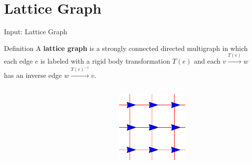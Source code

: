 \documentclass[10pt]{beamer}
\newcommand{\edge}[3]{{#1}\overset{#2}{\longrightarrow}{#3}}
\begin{document}
\section{Lattice Graph}
\begin{frame}{Input: Lattice Graph}
    \begin{bclogo}[logo=\bccrayon, couleur=orange!10, arrondi=0.2, ombre=true]{Definition}
      A \textbf{lattice graph} is a strongly connected directed
      multigraph in which each edge $e$ is labeled with a rigid body
      transformation $T(e)$ and each $\edge{v}{T(e)}{w}$ has an
      inverse edge $\edge{w}{T(e)^{-1}}{v}$.  
    \end{bclogo}
    \begin{columns}[T] %
      \begin{column}{.45\textwidth}
        \begin{figure}
          \centering
        \end{figure}
      \end{column}%
      \begin{column}{.45\textwidth}
        \begin{figure}
          \centering
          \includegraphics[scale=1]{figs/squarelattice}
        \end{figure}
      \end{column}%
    \end{columns}
\end{frame}
\end{document}
